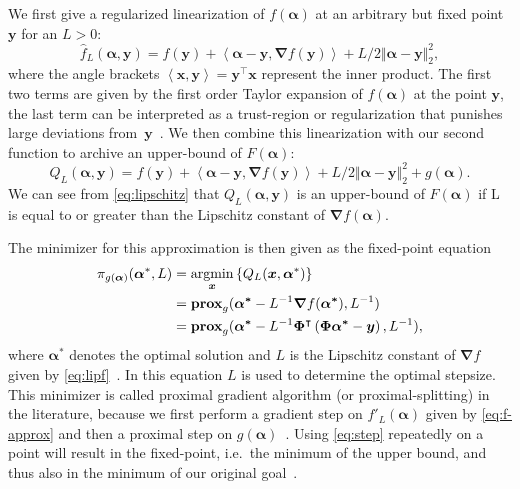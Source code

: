 We first give a regularized linearization of \(f(\bm{\alpha})\) at an arbitrary but fixed point \(\bm{y}\) for an \(L > 0\):
\begin{equation}\label{eq:f-approx}
  \hat{f}_L(\bm{\alpha}, \bm{y}) = f(\bm{y}) + \left< \bm{\alpha} - \bm{y}, \bm{\nabla} f (\bm{y}) \right> +
  L/2 \Vert \bm{\alpha} - \bm{y} \Vert_2^2,
\end{equation}
where the angle brackets \( \left< \bm{x}, \bm{y} \right> = \bm{y}^\intercal \bm{x} \) represent the inner product.
The first two terms are given by the first order Taylor expansion of \(f(\bm{\alpha})\) at the point \(\bm{y}\), the last term can be interpreted as a trust-region or regularization that punishes large deviations from~\(\bm{y}\)~\cite{proxsurvey}.
We then combine this linearization with our second function to archive an upper-bound of \(F(\bm{\alpha})\):
\begin{equation}\label{eq:goal-approx}
  Q_L(\bm{\alpha}, \bm{y}) = f(\bm{y}) + \left< \bm{\alpha} - \bm{y}, \bm{\nabla} f (\bm{y}) \right> +
  L/2 \Vert \bm{\alpha} - \bm{y} \Vert_2^2 +
  g(\bm{\alpha}).
\end{equation}
We can see from \cref{eq:lipschitz} that \(Q_L(\bm{\alpha}, \bm{y})\) is an
upper-bound of \(F(\bm{\alpha})\) if L is equal to or greater than the Lipschitz
constant of \(\bm{\nabla} f(\bm{\alpha})\).

The minimizer for this approximation is then given as the fixed-point equation
\begin{align}\label{eq:step}
  \pi_{g(\bm{\alpha})}(\bm{\alpha}^*, L) &=  \argmin_{\bm{x}} \left\{ Q_L(\bm{x}, \bm{\alpha}^*) \right\}\nonumber\\
       &= \prox[\(g\)]{\bm{\alpha^*} - L^{-1} \bm{\nabla} f (\bm{\alpha^*})}{L^{-1} } \nonumber\\
       &= \prox[\(g\)]{\bm{\alpha^*} - L^{-1} \bm{\Phi}^\intercal \left(\bm{\Phi} \bm{\alpha^*} - \bm{y} \right)}
         {L^{-1}},
\end{align}
where \(\bm{\alpha}^*\) denotes the optimal solution and \(L\) is the Lipschitz constant of \(\bm{\nabla} f\) given by \cref{eq:lipf}~\cite{fista}.
In this equation \(L\) is used to determine the optimal stepsize.
This minimizer is called proximal gradient algorithm (or proximal-splitting) in the literature, because we first perform a gradient step on \(f'_L(\bm{\alpha})\) given by \cref{eq:f-approx} and then a proximal step on \(g(\bm{\alpha})\)~\cite{proxsurvey}.
Using \cref{eq:step} repeatedly on a point will result in the fixed-point, i.e.~the minimum of the upper bound, and thus also in the minimum of our original goal~\cite{proxsurvey}.

